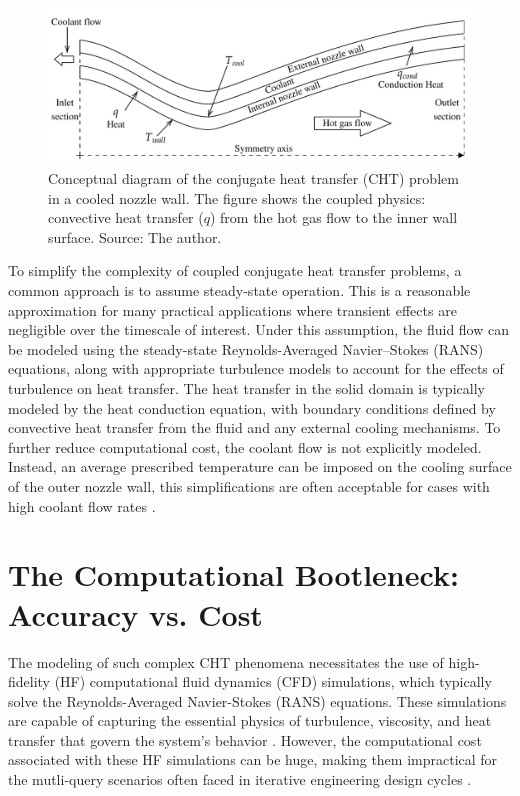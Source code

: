 \documentclass[tg, EN]{ufabcFHZh_tg}
\begin{document}
\begin{figure}[H]
    \centering
    \includegraphics[width=\textwidth]{Figuras/cd_nozzle_cht.pdf}
    \caption{Conceptual diagram of the conjugate heat transfer (CHT) problem in a cooled nozzle wall. The figure shows the coupled physics: convective heat transfer ($q$) from the hot gas flow to the inner wall surface. Source: The author.}
    \label{fig:cht_problem}
\end{figure}

To simplify the complexity of coupled conjugate heat transfer problems, a common approach is to assume steady-state operation. This is a reasonable approximation for many practical applications where transient effects are negligible over the timescale of interest. Under this assumption, the fluid flow can be modeled using the steady-state Reynolds-Averaged Navier–Stokes (RANS) equations, along with appropriate turbulence models to account for the effects of turbulence on heat transfer. The heat transfer in the solid domain is typically modeled by the heat conduction equation, with boundary conditions defined by convective heat transfer from the fluid and any external cooling mechanisms. To further reduce computational cost, the coolant flow is not explicitly modeled. Instead, an average prescribed temperature can be imposed on the cooling surface of the outer nozzle wall, this simplifications are often acceptable for cases with high coolant flow rates \citep{Engblom2007}.



\section{The Computational Bootleneck: Accuracy vs. Cost}

The modeling of such complex CHT phenomena necessitates the use of high-fidelity (HF) computational fluid dynamics (CFD) simulations, which typically solve the Reynolds-Averaged Navier-Stokes (RANS) equations. These simulations are capable of capturing the essential physics of turbulence, viscosity, and heat transfer that govern the system's behavior \citep{wilcox1998}. However, the computational cost associated with these HF simulations can be huge, making them impractical for the mutli-query scenarios often faced in iterative engineering design cycles \citep{hesthaven2016, benner2015, quarteroni2016}.
\end{document}
